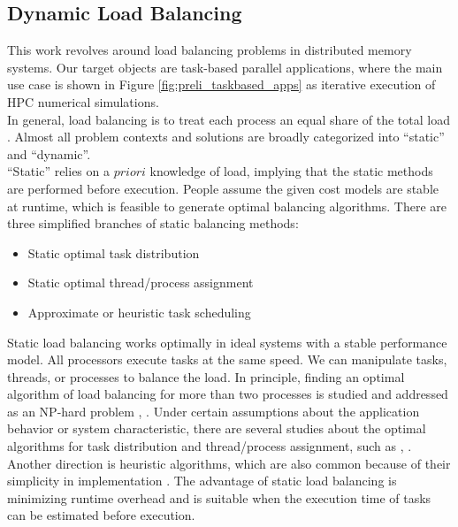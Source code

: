 
\subsection{Dynamic Load Balancing} \label{subsec:dlb}

This work revolves around load balancing problems in distributed memory systems. Our target objects are task-based parallel applications, where the main use case is shown in Figure \ref{fig:preli_taskbased_apps} as iterative execution of HPC numerical simulations.\\

In general, load balancing is to treat each process an equal share of the total load \cite{cybenko1989dynamic}. Almost all problem contexts and solutions are broadly categorized into ``static'' and ``dynamic''.\\

``Static'' relies on a $priori$ knowledge of load, implying that the static methods are performed before execution. People assume the given cost models are stable at runtime, which is feasible to generate optimal balancing algorithms. There are three simplified branches of static balancing methods:
\begin{itemize}
	\item Static optimal task distribution
	\item Static optimal thread/process assignment
	\item Approximate or heuristic task scheduling
\end{itemize}

Static load balancing works optimally in ideal systems with a stable performance model. All processors execute tasks at the same speed. We can manipulate tasks, threads, or processes to balance the load. In principle, finding an optimal algorithm of load balancing for more than two processes is studied and addressed as an NP-hard problem \cite{bokhari1981mapping}, \cite{bokhari1988partitioning}. Under certain assumptions about the application behavior or system characteristic, there are several studies about the optimal algorithms for task distribution and thread/process assignment, such as \cite{bokhari1987assignment}, \cite{nicol1996static}. Another direction is heuristic algorithms, which are also common because of their simplicity in implementation \cite{benmohammed1991evallb} \cite{bowen1992assignment}. The advantage of static load balancing is minimizing runtime overhead and is suitable when the execution time of tasks can be estimated before execution. \\

